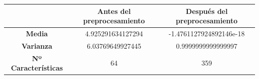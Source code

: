 \documentclass[12pt]{article}
\begin{document}
\begin{table}[H]
\begin{tabular}{c|c|c|}
\cline{2-3}
                                                  & \textbf{Antes del preprocesamiento} & \textbf{Después del preprocesamiento} \\ \hline
\multicolumn{1}{|c|}{\textbf{Media}}              & 4.925291634127294                   & -1.4761127924892146e-18               \\ \hline
\multicolumn{1}{|c|}{\textbf{Varianza}}           & 6.03769649927445                    & 0.9999999999999997                    \\ \hline
\multicolumn{1}{|c|}{\textbf{Nº Características}} & 64                                  & 359                                   \\ \hline
\end{tabular}
\end{table}

\begin{figure}[H]
\centering
\end{figure}
\end{document}
